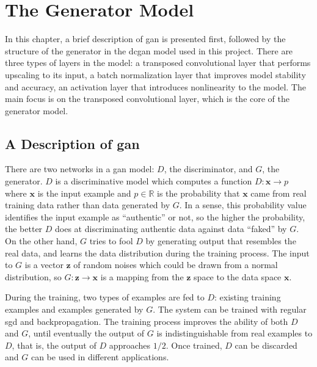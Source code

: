 
\chapter{The Generator Model}

In this chapter, a brief description of \gls{gan} \cite{goodfellow:gan} is presented first, followed by the
structure of the generator in the \gls{dcgan} model used in this project. There are three types of layers in
the model: a transposed convolutional layer that performs upscaling to its input, a batch normalization layer
that improves model stability and accuracy, an activation layer that introduces nonlinearity to the model.
The main focus is on the transposed convolutional layer, which is the core of the generator model.

\section{A Description of \gls{gan}}

There are two networks in a \gls{gan} model: $D$, the discriminator, and $G$, the generator. $D$ is a
discriminative model which computes a function $D: \boldsymbol{x} \rightarrow p$ where $\boldsymbol{x}$ is the
input example and $p \in \mathbb{R}$ is the probability that $\boldsymbol{x}$ came from real training data
rather than data generated by $G$. In a sense, this probability value identifies the input example as
``authentic'' or not, so the higher the probability, the better $D$ does at discriminating authentic data
against data ``faked'' by $G$. On the other hand, $G$ tries to fool $D$ by generating output that resembles
the real data, and learns the data distribution during the training process. The input to $G$ is a vector
$\boldsymbol{z}$ of random noises which could be drawn from a normal distribution, so $G: \boldsymbol{z}
\rightarrow \boldsymbol{x}$ is a mapping from the $\boldsymbol{z}$ space to the data space $\boldsymbol{x}$.

During the training, two types of examples are fed to $D$: existing training examples and examples generated
by $G$. The system can be trained with regular \gls{sgd} and backpropagation. The training
process improves the ability of both $D$ and $G$, until eventually the output of $G$ is indistinguishable
from real examples to $D$, that is, the output of $D$ approaches $1/2$. Once trained, $D$ can be discarded
and $G$ can be used in different applications.

